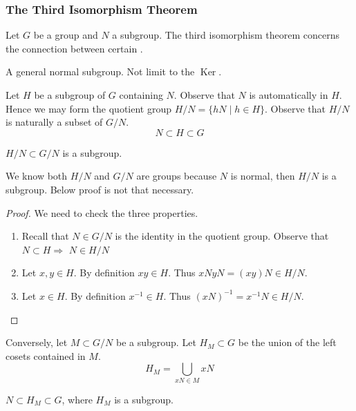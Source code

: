 \documentclass{article}
\newcommand{\Ker}{\operatorname{Ker}}
\begin{document}
\subsubsection{The Third Isomorphism Theorem}
Let $G$ be a group and $N$ a  subgroup. The third isomorphism theorem concerns the connection between certain .
\begin{rema}
A general normal subgroup. Not limit to the $\Ker$.
\end{rema}


Let $H$ be a subgroup of $G$ containing $N$. Observe that $N$ is automatically  in $H .$ Hence we may form the quotient group $H / N=\{h N \mid h \in H\}$. Observe that $H / N$ is naturally a subset of $G / N$.
$$N\subset H\subset G$$
\begin{lema}
$H / N \subset G / N$ is a subgroup.
\end{lema}
\begin{rema}
We know both $H/ N$ and  $G / N$ are groups because $N$  is normal, then $H/ N$ is a subgroup. Below proof is not that necessary.
\end{rema}
\begin{proof}We need to check the three properties.
\begin{enumerate}
    \item Recall that $N \in G / N$ is the identity in the quotient group. Observe that $N \subset H \Rightarrow$ $N \in H / N$
    \item Let $x, y \in H .$ By definition $x y \in H .$ Thus $x N y N=(x y) N \in H / N$.
    \item Let $x \in H$. By definition $x^{-1} \in H$. Thus $(x N)^{-1}=x^{-1} N \in H / N$.
\end{enumerate}
\end{proof} 

Conversely, let $M \subset G / N$ be a subgroup. Let $H_{M} \subset G$ be the union of the left cosets contained in $M$.
$$H_M=\bigcup_{xN\in M} xN $$
\begin{lema}
$N\subset H_{M} \subset G$, where $H_{M}$ is a subgroup.
\end{lema} 
\end{document}
